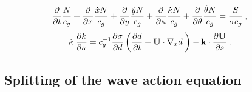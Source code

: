 
\begin{equation}
\frac{\p}{\p t} \frac{N}{c_g} +  
\frac{\p}{\p x} \frac{\dot{x} N}{c_g} + 
\frac{\p}{\p y} \frac{\dot{y} N}{c_g} + 
\frac{\p}{\p \kappa} \frac{\dot{\kappa} N}{c_g} + 
\frac{\p}{\p \theta} \frac{\dot{\theta} N}{c_g}  =
\frac{S}{\sigma c_g} \: , \label{eq:bal_f_grid} \end{equation} \begin{equation}
\dot{\kappa} \:\frac{\p k}{\p \kappa} =
     c_g^{-1} \frac{\p \sigma}{\p d} \left (
    \frac{\p d}{\p t} + {\bf U} \cdot \nabla_x d \: \right ) -
    {\bf k} \cdot \frac{\p {\bf U}}{\p s}
\: . \label{eq:sigma_dot}
\end{equation}

\noindent

\vssub
\subsection{~Splitting of the wave action equation} \label{sec:basic_num}
\vsssub

